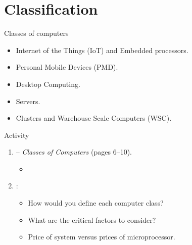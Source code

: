 \section{Classification}

\begin{frame}[t]{Classes of computers}
\begin{itemize}
  \item Internet of the Things (IoT) and Embedded processors.
  \item Personal Mobile Devices (PMD).
  \item Desktop Computing.
  \item Servers.
  \item Clusters and Warehouse Scale Computers (WSC).  
\end{itemize}
\end{frame}

\begin{frame}[t]{Activity}
\begin{enumerate}
  \item {}  -- 
        \emph{Classes of Computers} (pages 6--10).
    \begin{itemize}
      \item \credithennessy
    \end{itemize}

  \item {}:
    \begin{itemize}
      \item How would you define each computer class?
      \item What are the critical factors to consider?
      \item Price of system versus prices of microprocessor.
    \end{itemize}
\end{enumerate}
\end{frame}
